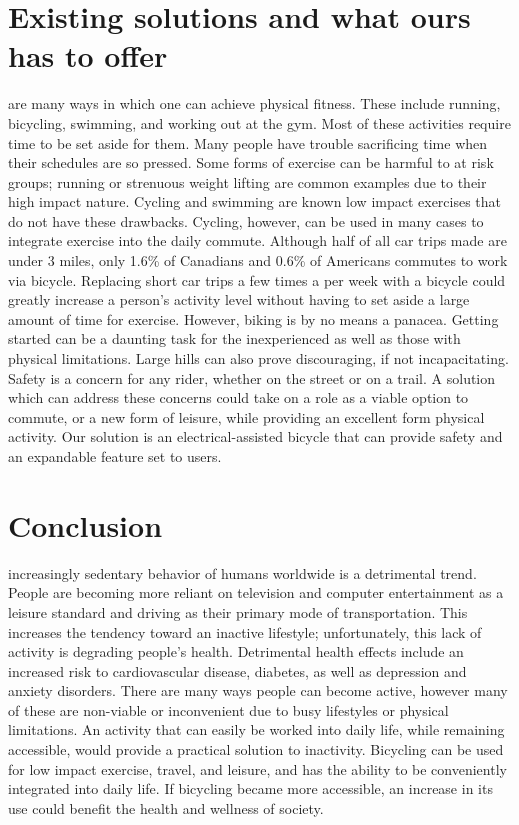 \documentclass[12pt,journal]{IEEEtran}
\begin{document}
	\section{Existing solutions and what ours has to offer}
		 are many ways in which one can achieve physical fitness. These include running, bicycling, swimming, and working out at the gym.  Most of these activities 
		require time to be set aside for them. Many people have trouble sacrificing time when their schedules are so pressed. Some forms of exercise can be harmful to 
		at risk groups; running or strenuous weight lifting are common examples due to their high impact nature. Cycling and swimming are known low impact exercises 
		that do not have these drawbacks. Cycling, however, can be used in many cases to integrate exercise into the daily commute. Although half of all car trips 
		made are under 3 miles, only 1.6\% of Canadians and 0.6\% of Americans commutes to work via bicycle.\cite{22} Replacing short car trips a few times a per 
		week with a bicycle could greatly increase a person’s activity level without having to set aside a large amount of time for exercise. 
		However, biking is by no means a panacea. Getting started can be a daunting task for the inexperienced as well as those with physical limitations. Large 
		hills can also prove discouraging, if not incapacitating. Safety is a concern for any rider, whether on the street or on a trail. A solution which can 
		address these concerns could take on a role as a viable option to commute, or a new form of leisure, while providing an excellent form physical activity. 
		Our solution is an electrical-assisted bicycle that can provide safety and an expandable feature set to users.
		
	\section{Conclusion}
		 increasingly sedentary behavior of humans worldwide is a detrimental trend. People are becoming more reliant on television and computer entertainment 
		as a leisure standard and driving as their primary mode of transportation. This increases the tendency toward an inactive lifestyle; unfortunately, this 
		lack of activity is degrading people’s health. Detrimental health effects include an increased risk to cardiovascular disease, diabetes, as well as depression 
		and anxiety disorders. There are many ways people can become active, however many of these are non-viable or inconvenient due to busy lifestyles or physical 
		limitations. An activity that can easily be worked into daily life, while remaining accessible, would provide a practical solution to inactivity. Bicycling 
		can be used for low impact exercise, travel, and leisure, and has the ability to be conveniently integrated into daily life.  If bicycling became more accessible, 
		an increase in its use could benefit the health and wellness of society.
	



\end{document}
